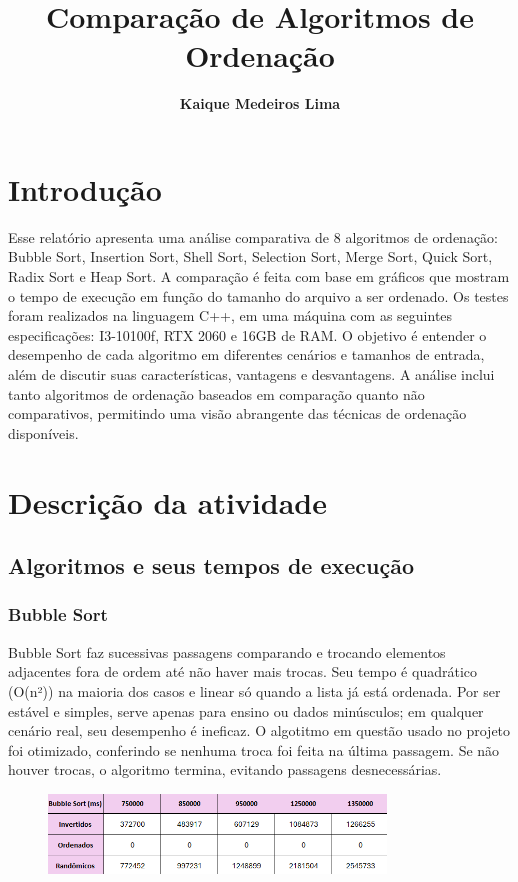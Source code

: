 \documentclass[a4paper, 12pt]{article}
\title{\bf Comparação de Algoritmos de Ordenação}
\author{\bf Kaique Medeiros Lima}
\date{}
\begin{document}
\maketitle

\section{Introdução}
    Esse relatório apresenta uma análise comparativa de 8 algoritmos de ordenação: Bubble Sort, Insertion Sort, Shell Sort, Selection Sort, Merge Sort, Quick Sort, Radix Sort e Heap Sort. A comparação é feita com base em gráficos que mostram o tempo de execução em função do tamanho do arquivo a ser ordenado. Os testes foram realizados na linguagem C++, em uma máquina com as seguintes especificações: I3-10100f, RTX 2060 e 16GB de RAM.
    O objetivo é entender o desempenho de cada algoritmo em diferentes cenários e tamanhos de entrada, além de discutir suas características, vantagens e desvantagens. A análise inclui tanto algoritmos de ordenação baseados em comparação quanto não comparativos, permitindo uma visão abrangente das técnicas de ordenação disponíveis.

\section{Descrição da atividade}
    \subsection{Algoritmos e seus tempos de execução}
        \subsubsection{Bubble Sort}
            Bubble Sort faz sucessivas passagens comparando e trocando elementos adjacentes fora de ordem até não haver mais trocas. Seu tempo é quadrático (O(n²)) na maioria dos casos e linear só quando a lista já está ordenada. Por ser estável e simples, serve apenas para ensino ou dados minúsculos; em qualquer cenário real, seu desempenho é ineficaz. O algotitmo em questão usado no projeto foi otimizado, conferindo se nenhuma troca foi feita na última passagem. Se não houver trocas, o algoritmo termina, evitando passagens desnecessárias.

            \begin{figure}[ht]
                \centering
                \includegraphics[width=0.8\textwidth]{images/bubble.png}
            \end{figure}
\end{document}
